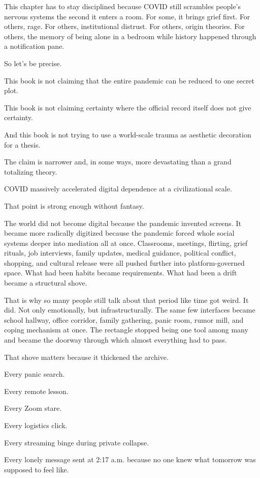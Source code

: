 \documentclass[
  american,
  12pt,
  letterpaper,
]{article}
\begin{document}
This chapter has to stay disciplined because COVID still scrambles
people's nervous systems the second it enters a room. For some, it
brings grief first. For others, rage. For others, institutional
distrust. For others, origin theories. For others, the memory of being
alone in a bedroom while history happened through a notification pane.

So let's be precise.

This book is not claiming that the entire pandemic can be reduced to one
secret plot.

This book is not claiming certainty where the official record itself
does not give certainty.

And this book is not trying to use a world-scale trauma as aesthetic
decoration for a thesis.

The claim is narrower and, in some ways, more devastating than a grand
totalizing theory.

COVID massively accelerated digital dependence at a civilizational
scale.

That point is strong enough without fantasy.

The world did not become digital because the pandemic invented screens.
It became more radically digitized because the pandemic forced whole
social systems deeper into mediation all at once. Classrooms, meetings,
flirting, grief rituals, job interviews, family updates, medical
guidance, political conflict, shopping, and cultural release were all
pushed further into platform-governed space. What had been habits became
requirements. What had been a drift became a structural shove.

That is why so many people still talk about that period like time got
weird. It did. Not only emotionally, but infrastructurally. The same few
interfaces became school hallway, office corridor, family gathering,
panic room, rumor mill, and coping mechanism at once. The rectangle
stopped being one tool among many and became the doorway through which
almost everything had to pass.

That shove matters because it thickened the archive.

Every panic search.

Every remote lesson.

Every Zoom stare.

Every logistics click.

Every streaming binge during private collapse.

Every lonely message sent at 2:17 a.m. because no one knew what tomorrow
was supposed to feel like.
\end{document}
